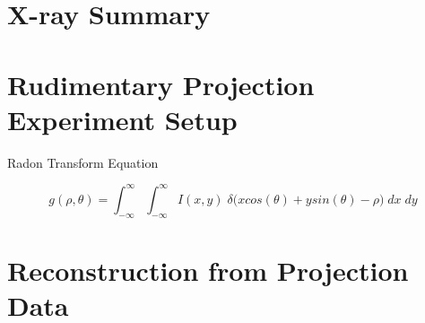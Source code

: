\section{X-ray Summary}

\section{Rudimentary Projection Experiment Setup}

Radon Transform Equation

\begin{equation}
g(\rho,\theta) = \int_{-\infty}^{\infty} \int_{-\infty}^{\infty} I(x,y) \; \delta \big(xcos(\theta) + ysin(\theta) - \rho \big) \; dx \; dy
\end{equation}

\section{Reconstruction from Projection Data}